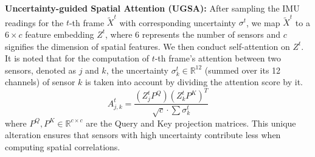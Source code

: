 \documentclass[letterpaper]{article} %
\begin{document}
\textbf{Uncertainty-guided Spatial Attention (UGSA):}
After sampling the IMU readings for the \(t\)-th frame \(\widetilde{X}^{t}\) with corresponding uncertainty \(\sigma^{t}\), we map \(\widetilde{X}^{t}\) to a \(6 \times c\) feature embedding \(Z^{t}\), where 6 represents the number of sensors and \(c\) signifies the dimension of spatial features. We then conduct self-attention \cite{vaswani2017attention} on ${Z}^{t}$.
It is noted that for the computation of $t$-th frame's attention between two sensors, denoted as $j$ and $k$, the uncertainty $\sigma_{k}^{t}\in \mathbb{R}^{12}$ (summed over its 12 channels) of sensor $k$ is taken into account by dividing the attention score by it. 
\begin{equation}
A_{j,k}^{t}=\frac{\left(Z_j^{t} P^Q\right)\left(Z_k^{t} P^K\right)^T}{\sqrt{c} \cdot \sum{\sigma_k^{t}}}
\end{equation}
where $P^Q,P^K \in \mathbb{R}^{c\times c}$ are the Query and Key projection matrices. This unique alteration ensures that sensors with high uncertainty contribute less when computing spatial correlations.
\end{document}
